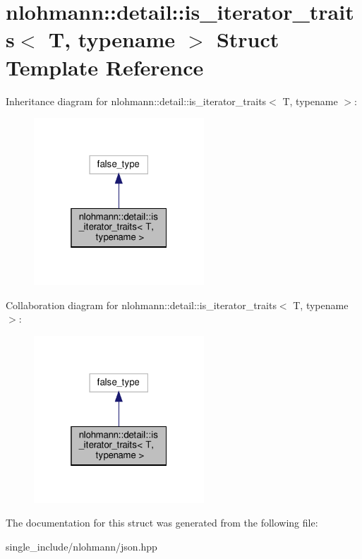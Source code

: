 \hypertarget{structnlohmann_1_1detail_1_1is__iterator__traits}{}\section{nlohmann\+:\+:detail\+:\+:is\+\_\+iterator\+\_\+traits$<$ T, typename $>$ Struct Template Reference}
\label{structnlohmann_1_1detail_1_1is__iterator__traits}


Inheritance diagram for nlohmann\+:\+:detail\+:\+:is\+\_\+iterator\+\_\+traits$<$ T, typename $>$\+:\nopagebreak
\begin{figure}[H]
\begin{center}
\leavevmode
\includegraphics[width=181pt]{structnlohmann_1_1detail_1_1is__iterator__traits__inherit__graph}
\end{center}
\end{figure}


Collaboration diagram for nlohmann\+:\+:detail\+:\+:is\+\_\+iterator\+\_\+traits$<$ T, typename $>$\+:\nopagebreak
\begin{figure}[H]
\begin{center}
\leavevmode
\includegraphics[width=181pt]{structnlohmann_1_1detail_1_1is__iterator__traits__coll__graph}
\end{center}
\end{figure}


The documentation for this struct was generated from the following file\+:\begin{DoxyCompactItemize}
\item 
single\+\_\+include/nlohmann/json.\+hpp\end{DoxyCompactItemize}
